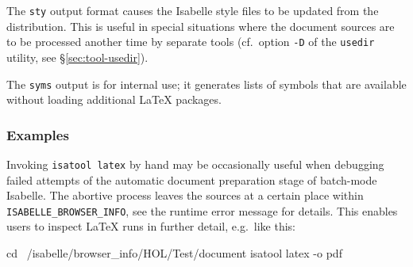 The \texttt{sty} output format causes the Isabelle style files to be updated
from the distribution.  This is useful in special situations where the
document sources are to be processed another time by separate tools (cf.\ 
option \texttt{-D} of the \texttt{usedir} utility, see
\S\ref{sec:tool-usedir}).

The \texttt{syms} output is for internal use; it generates lists of symbols
that are available without loading additional {\LaTeX} packages.


\subsubsection*{Examples}

Invoking \texttt{isatool latex} by hand may be occasionally useful when
debugging failed attempts of the automatic document preparation stage of
batch-mode Isabelle.  The abortive process leaves the sources at a certain
place within \texttt{ISABELLE_BROWSER_INFO}, see the runtime error message for
details.  This enables users to inspect {\LaTeX} runs in further detail, e.g.\ 
like this:

\begin{ttbox}
  cd ~/isabelle/browser_info/HOL/Test/document
  isatool latex -o pdf
\end{ttbox}


